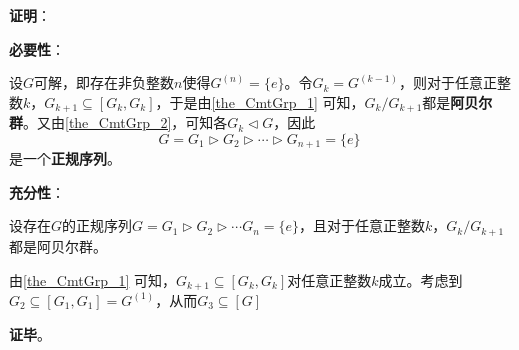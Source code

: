 \textbf{证明}：

\textbf{必要性}：

设$G$可解，即存在非负整数$n$使得$G^{(n)}=\{e\}$。令$G_k=G^{(k-1)}$，则对于任意正整数$k$，$G_{k+1}\subseteq [G_k, G_k]$，于是由\autoref{the_CmtGrp_1} 可知，$G_k/G_{k+1}$都是\textbf{阿贝尔群}。又由\autoref{the_CmtGrp_2}，可知各$G_k\lhd G$，因此
\begin{equation}
G=G_1\rhd G_2\rhd\cdots\rhd G_{n+1}=\{e\}~
\end{equation}
是一个\textbf{正规序列}。

\textbf{充分性}：

设存在$G$的正规序列$G=G_1\rhd G_2\rhd\cdots G_n=\{e\}$，且对于任意正整数$k$，$G_k/G_{k+1}$都是阿贝尔群。

由\autoref{the_CmtGrp_1} 可知，$G_{k+1}\subseteq [G_k, G_k]$对任意正整数$k$成立。考虑到$G_2\subseteq[G_1, G_1]=G^{(1)}$，从而$G_3\subseteq[G]$
    

\textbf{证毕}。




































